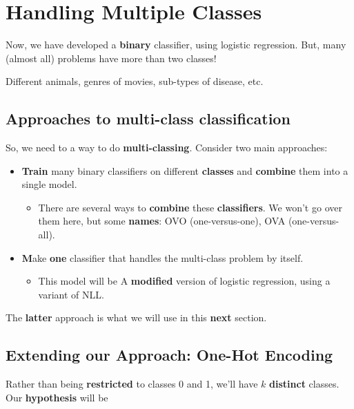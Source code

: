 
\section*{Handling Multiple Classes}

    Now, we have developed a \textbf{binary} classifier, using logistic regression. But, many (almost all) problems have more than two classes! 
    
    \miniex Different animals, genres of movies, sub-types of disease, etc.
    
    \subsection{Approaches to multi-class classification}
        
        So, we need to a way to do \textbf{multi-classing}. Consider two main approaches:
        
        \begin{itemize}
            \item \textbf{Train} many binary classifiers on different \textbf{classes} and \textbf{combine} them into a single model.
                \begin{itemize}
                    \item There are several ways to \textbf{combine} these \textbf{classifiers}. We won't go over them here, but some \textbf{names}: OVO (one-versus-one), OVA (one-versus-all).
                \end{itemize}
                
            \item \textbf Make \textbf{one} classifier that handles the multi-class problem by itself. 
                \begin{itemize}
                    \item This model will be A \textbf{modified} version of logistic regression, using a variant of NLL.
                \end{itemize}
    \end{itemize}
    
    The \textbf{latter} approach is what we will use in this \textbf{next} section.
    
    \subsection*{Extending our Approach: One-Hot Encoding}
    
        Rather than being \textbf{restricted} to classes 0 and 1, we'll have $k$ \textbf{distinct} classes. Our \textbf{hypothesis} will be
        
